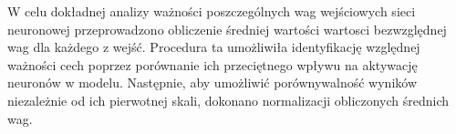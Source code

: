 \documentclass[a4paper,twoside,12pt]{book}
\begin{document}
W celu dokładnej analizy ważności poszczególnych wag wejściowych sieci neuronowej przeprowadzono obliczenie średniej wartości wartosci bezwzględnej wag dla każdego z wejść. Procedura ta umożliwiła identyfikację względnej ważności cech poprzez porównanie ich przeciętnego wpływu na aktywację neuronów w modelu. Następnie, aby umożliwić porównywalność wyników niezależnie od ich pierwotnej skali, dokonano normalizacji obliczonych średnich wag.


\begin{table}[!h]
  \centering
  \caption{Porównianie ważności wejść dla metody PFI}
\end{table}
\end{document}
